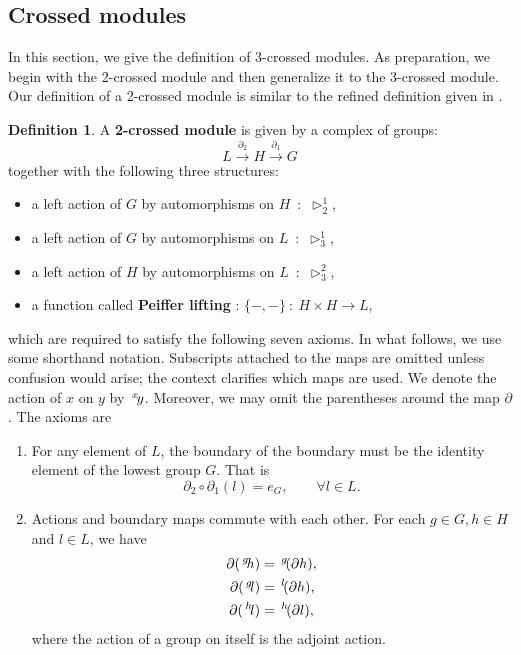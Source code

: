\documentclass[11pt, reqno]{amsart} %
\newcommand{\act}[1]{\,\sp{#1}\!}
\theoremstyle{definition}
\newtheorem{definition}[theorem]{Definition}
\theoremstyle{remark}
\numberwithin{equation}{section}
\begin{document}
\subsection{Crossed modules} \label{sec:CM}
In this section, we give the definition of 3-crossed modules. As preparation, we begin with the 2-crossed module and then generalize it to the 3-crossed module. Our definition of a 2-crossed module is similar to the refined definition given in \cite{Sarikaya:2024}.

\begin{definition}\label{def:2CM}
A \textbf{2-crossed module} is given by a complex of groups:
\[
  L\overset{\partial_2}{\longrightarrow} H\overset{\partial_1}{\longrightarrow} G
\]
together with the following three structures:
\begin{itemize}
  \item a left action of $G$ by automorphisms on $H$~:~$\triangleright^1_2$,
  \item a left action of $G$ by automorphisms on $L$~:~$\triangleright^1_3$,
  \item a left action of $H$ by automorphisms on $L$~:~$\triangleright^2_3$,
  \item a function called \textbf{Peiffer lifting} : $\{-,-\}~:~H\times H\to L$,
\end{itemize}
which are required to satisfy the following seven axioms. In what follows, we use some shorthand notation. Subscripts attached to the maps are omitted unless confusion would arise; the context clarifies which maps are used. We denote the action of $x$ on $y$ by $\act{x}y$. Moreover, we may omit the parentheses around the map $\partial$. The axioms are
\begin{enumerate}
  \item \label{ax:2CM-exact}For any element of $L$, the boundary of the boundary must be the identity element of the lowest group $G$. That is
  \[
    \partial_2\circ\partial_1(l) = e_G,\qquad \forall l\in L.
  \]
  \item \label{ax:2CM-BAction}Actions and boundary maps commute with each other. For each $g\in G,h\in H$ and $l\in L$, we have
  \begin{align}
    \nonumber
    \partial(\act{g}h) &= \act{g}(\partial h), \\
    \nonumber
    \partial(\act{g}l) &= \act{l}(\partial h), \\
    \nonumber
    \partial(\act{h}l) &= \act{h}(\partial l),
  \end{align}
  where the action of a group on itself is the adjoint action.

\end{enumerate}
\end{definition}
\end{document}
